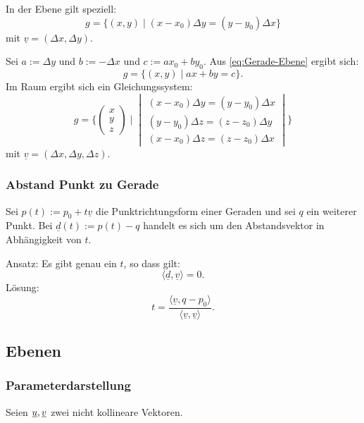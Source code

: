 In der Ebene gilt speziell:
\begin{equation}\label{eq:Gerade-Ebene}
g = \{(x,y)\mid (x-x_0)\Delta y = (y-y_0)\Delta x\}
\end{equation}
mit $\underline v=(\Delta x,\Delta y)$.

Sei $a:=\Delta y$ und $b:=-\Delta x$ und $c:=ax_0+by_0$.
Aus \eqref{eq:Gerade-Ebene} ergibt sich:
\begin{equation}
g = \{(x,y)\mid ax+by=c\}.
\end{equation}
Im Raum ergibt sich ein Gleichungssystem:
\begin{equation}
g = \{\begin{pmatrix}x\\ y\\ z\end{pmatrix}
\mid
\begin{vmatrix}
(x-x_0)\Delta y = (y-y_0)\Delta x\\
(y-y_0)\Delta z = (z-z_0)\Delta y\\
(x-x_0)\Delta z = (z-z_0)\Delta x
\end{vmatrix}\}
\end{equation}
mit $\underline v=(\Delta x,\Delta y,\Delta z)$.

\subsubsection{Abstand Punkt zu Gerade}
Sei $p(t):=p_0+t\underline v$ die Punktrichtungsform einer Geraden und
sei $q$ ein weiterer Punkt. Bei $\underline d(t):=p(t)-q$ handelt
es sich um den Abstandsvektor in Abhängigkeit von $t$.

Ansatz: Es gibt genau ein $t$, so dass gilt:
\begin{equation}
\langle\underline d,\underline v\rangle=0.
\end{equation}
Lösung:
\begin{equation}
t = \frac
  {\langle\underline v,q{-}p_0\rangle}
  {\langle\underline v,\underline v\rangle}.
\end{equation}

\subsection{Ebenen}
\subsubsection{Parameterdarstellung}
Seien $\underline{u}, \underline{v}$ zwei nicht kollineare Vektoren.

